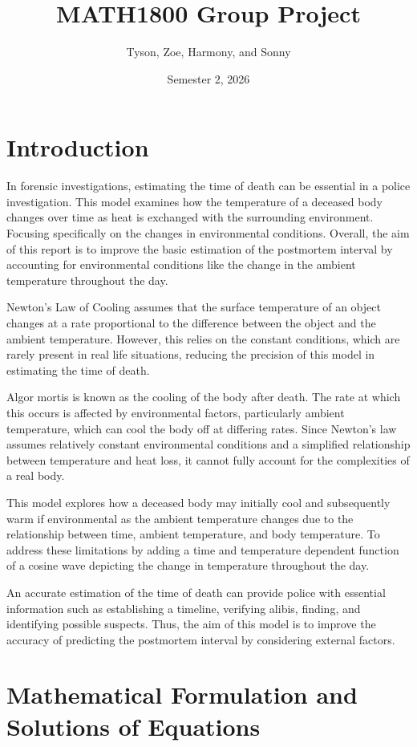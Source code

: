 \documentclass{article}
\title{MATH1800 Group Project}
\author{Tyson, Zoe, Harmony, and Sonny}
\date{Semester 2, 2026}
\begin{document}
\maketitle
\newpage
\tableofcontents
\newpage

\section{Introduction}
In forensic investigations, estimating the time of death can be essential in a police investigation. This model examines how the temperature of a deceased body changes over time as heat is exchanged with the surrounding environment. Focusing specifically on the changes in environmental conditions. Overall, the aim of this report is to improve the basic estimation of the postmortem interval by accounting for environmental conditions like the change in the ambient temperature throughout the day.

Newton’s Law of Cooling assumes that the surface temperature of an object changes at a rate proportional to the difference between the object and the ambient temperature. However, this relies on the constant conditions, which are rarely present in real life situations, reducing the precision of this model in estimating the time of death.

Algor mortis is known as the cooling of the body after death. The rate at which this occurs is affected by environmental factors, particularly ambient temperature, which can cool the body off at differing rates. Since Newton’s law assumes relatively constant environmental conditions and a simplified relationship between temperature and heat loss, it cannot fully account for the complexities of a real body.

This model explores how a deceased body may initially cool and subsequently warm if environmental as the ambient temperature changes due to the relationship between time, ambient temperature, and body temperature. To address these limitations by adding a time and temperature dependent function of a cosine wave depicting the change in temperature throughout the day.

An accurate estimation of the time of death can provide police with essential information such as establishing a timeline, verifying alibis, finding, and identifying possible suspects. Thus, the aim of this model is to improve the accuracy of predicting the postmortem interval by considering external factors.

\section{Mathematical Formulation and Solutions of Equations}
\end{document}
